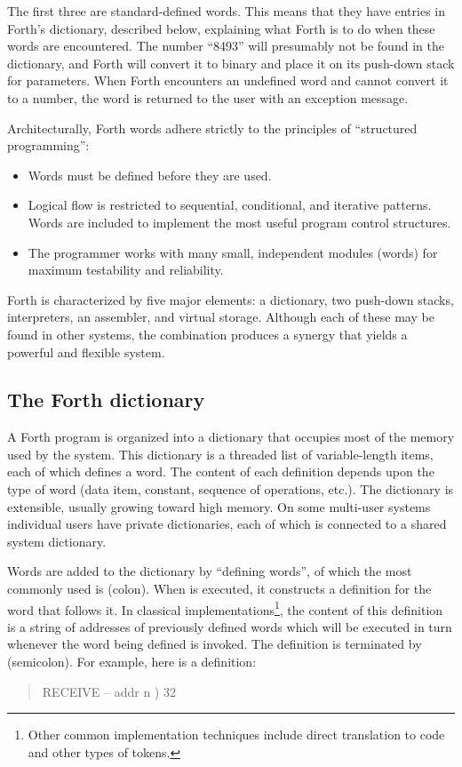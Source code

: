 \begin{quote}\ttfamily
	 \quad {} \quad \word{!} 
\end{quote}

The first three are standard-defined words. This means that they
have entries in Forth's dictionary, described below, explaining what
Forth is to do when these words are encountered. The number ``8493''
will presumably not be found in the dictionary, and Forth will
convert it to binary and place it on its push-down stack for
parameters. When Forth encounters an undefined word and cannot
convert it to a number, the word is returned to the user with an
exception message.

Architecturally, Forth words adhere strictly to the principles of
``structured programming'':

\begin{itemize}
\item Words must be defined before they are used.
\item Logical flow is restricted to sequential, conditional, and
	iterative patterns. Words are included to implement the most
	useful program control structures.
\item The programmer works with many small, independent modules
	(words) for maximum testability and reliability.
\end{itemize}

Forth is characterized by five major elements: a dictionary, two
push-down stacks, interpreters, an assembler, and virtual storage.
Although each of these may be found in other systems, the combination
produces a synergy that yields a powerful and flexible system.

\subsection{The Forth dictionary} %

A Forth program is organized into a dictionary that occupies most of
the memory used by the system. This dictionary is a threaded list of
variable-length items, each of which defines a word. The content of
each definition depends upon the type of word (data item, constant,
sequence of operations, etc.). The dictionary is extensible, usually
growing toward high memory. On some multi-user systems individual
users have private dictionaries, each of which is connected to a
shared system dictionary.

Words are added to the dictionary by ``defining words'', of which the
most commonly used is \word{:} (colon). When \word{:} is executed, it
constructs a definition for the word that follows it. In classical
implementations\footnote{%
Other common implementation techniques include direct translation to
code and other types of tokens.
}, the content of this definition is a string of addresses of
previously defined words which will be executed in turn whenever the
word being defined is invoked. The definition is terminated by
\word{;} (semicolon). For example, here is a definition:
\begin{quote}\ttfamily
	\word{:} RECEIVE  -- addr n )
		  32 
	\word{;}
\end{quote}

